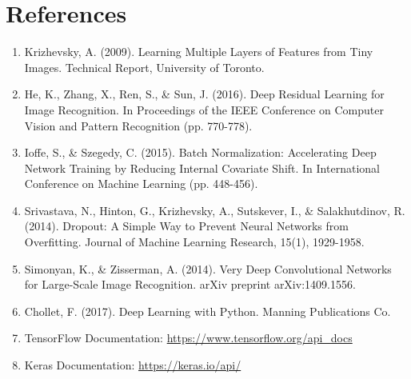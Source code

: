 \documentclass[12pt]{article}
\begin{document}
\section{References}
\begin{enumerate}
    \item Krizhevsky, A. (2009). Learning Multiple Layers of Features from Tiny Images. Technical Report, University of Toronto.
    
    \item He, K., Zhang, X., Ren, S., \& Sun, J. (2016). Deep Residual Learning for Image Recognition. In Proceedings of the IEEE Conference on Computer Vision and Pattern Recognition (pp. 770-778).
    
    \item Ioffe, S., \& Szegedy, C. (2015). Batch Normalization: Accelerating Deep Network Training by Reducing Internal Covariate Shift. In International Conference on Machine Learning (pp. 448-456).
    
    \item Srivastava, N., Hinton, G., Krizhevsky, A., Sutskever, I., \& Salakhutdinov, R. (2014). Dropout: A Simple Way to Prevent Neural Networks from Overfitting. Journal of Machine Learning Research, 15(1), 1929-1958.
    
    \item Simonyan, K., \& Zisserman, A. (2014). Very Deep Convolutional Networks for Large-Scale Image Recognition. arXiv preprint arXiv:1409.1556.
    
    \item Chollet, F. (2017). Deep Learning with Python. Manning Publications Co.
    
    \item TensorFlow Documentation: \url{https://www.tensorflow.org/api_docs}
    
    \item Keras Documentation: \url{https://keras.io/api/}
\end{enumerate}
\end{document}
